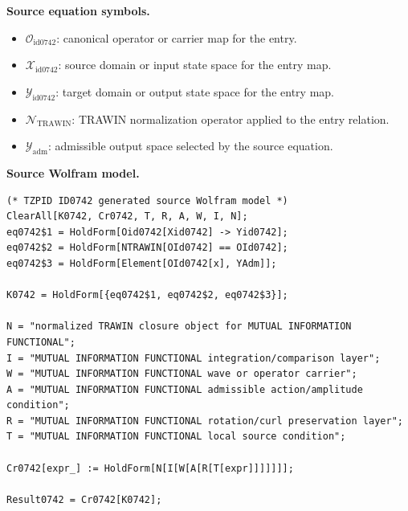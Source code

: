 \begin{minipage}[t]{0.49\linewidth}
\begingroup
\small
\raggedright
\textbf{Source equation symbols.}\par
\begin{itemize}[leftmargin=1.35em,itemsep=1pt,topsep=1pt,parsep=0pt]
    \item $\mathcal{O}_{\mathrm{id0742}}$: canonical operator or carrier map for the entry.
    \item $\mathcal{X}_{\mathrm{id0742}}$: source domain or input state space for the entry map.
    \item $\mathcal{Y}_{\mathrm{id0742}}$: target domain or output state space for the entry map.
    \item $\mathcal{N}_{\mathrm{TRAWIN}}$: TRAWIN normalization operator applied to the entry relation.
    \item $\mathcal{Y}_{\mathrm{adm}}$: admissible output space selected by the source equation.
\end{itemize}
\endgroup
\end{minipage}\hfill
\begin{minipage}[t]{0.47\linewidth}
\begingroup
\scriptsize
\raggedright
\textbf{Source Wolfram model.}\par
\begin{Verbatim}[fontsize=\tiny,breaklines=true,breakanywhere=true]
(* TZPID ID0742 generated source Wolfram model *)
ClearAll[K0742, Cr0742, T, R, A, W, I, N];
eq0742$1 = HoldForm[Oid0742[Xid0742] -> Yid0742];
eq0742$2 = HoldForm[NTRAWIN[OId0742] == OId0742];
eq0742$3 = HoldForm[Element[OId0742[x], YAdm]];

K0742 = HoldForm[{eq0742$1, eq0742$2, eq0742$3}];

N = "normalized TRAWIN closure object for MUTUAL INFORMATION FUNCTIONAL";
I = "MUTUAL INFORMATION FUNCTIONAL integration/comparison layer";
W = "MUTUAL INFORMATION FUNCTIONAL wave or operator carrier";
A = "MUTUAL INFORMATION FUNCTIONAL admissible action/amplitude condition";
R = "MUTUAL INFORMATION FUNCTIONAL rotation/curl preservation layer";
T = "MUTUAL INFORMATION FUNCTIONAL local source condition";

Cr0742[expr_] := HoldForm[N[I[W[A[R[T[expr]]]]]]];

Result0742 = Cr0742[K0742];
\end{Verbatim}
\endgroup
\end{minipage}

